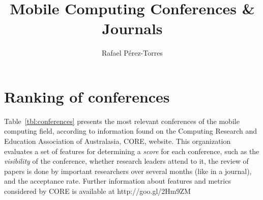\documentclass{article}
\begin{document}

\title{Mobile Computing Conferences \& Journals}
\author{Rafael P\'{e}rez-Torres}

\maketitle
{}
\section{Ranking of conferences}


Table~\ref{tbl:conferences} presents the most relevant conferences of the mobile computing field, according to information found on the Computing Research and Education Association of Australasia, CORE, website.
This organization evaluates a set of features for determining a \emph{score} for each conference, such as the \emph{visibility} of the conference, whether research leaders attend to it, the review of papers is done by important researchers over several months (like in a journal), and the acceptance rate.
Further information about features and metrics considered by CORE is available at http://goo.gl/2Hm9ZM
\end{document}
